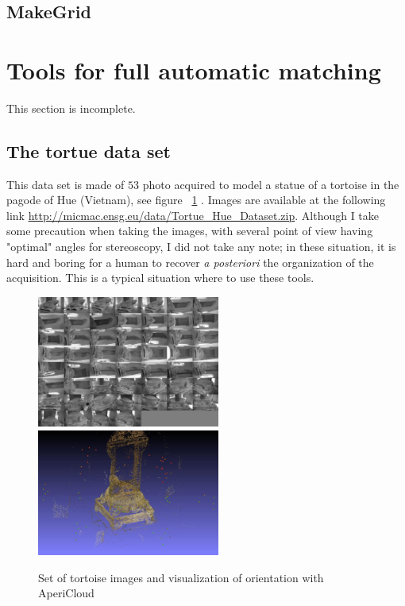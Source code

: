 \subsection{MakeGrid}
\label{MAKEGRID}





\section{Tools for full automatic  matching}

This section is incomplete.

\label{FullAutoMatch}

\subsection{The tortue data set}

This data set is made  of $53$ photo acquired to model a statue of a tortoise in the
pagode of Hue (Vietnam), see figure ~\ref{FIG:Tortue:Input} . Images are available at the following link \url{http://micmac.ensg.eu/data/Tortue_Hue_Dataset.zip}. Although I take some precaution when taking the images,
with several point of view having "optimal" angles for stereoscopy, I did not take any
note; in these situation,  it is hard and boring for a human to recover \emph{a posteriori} the organization
of the acquisition. This is a typical situation where to use these tools.


\begin{figure}
\begin{center}
\includegraphics[width=60mm]{FIGS/Tortue/AllTortues.jpg}
\includegraphics[width=60mm]{FIGS/Tortue/AP-snapshot00.jpg}
\end{center}
\caption{Set of tortoise images and visualization of orientation with AperiCloud}
\label{FIG:Tortue:Input}
\end{figure}




